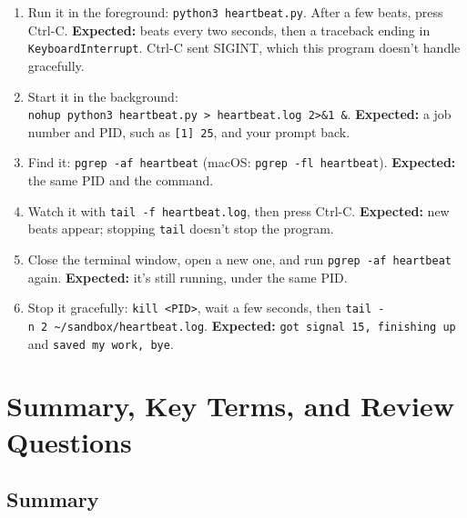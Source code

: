 \begin{enumerate}
\def\labelenumi{\arabic{enumi}.}
\tightlist
\item
  Run it in the foreground: \texttt{python3\ heartbeat.py}. After a few beats, press Ctrl-C. \textbf{Expected:} beats every two seconds, then a traceback ending in \texttt{KeyboardInterrupt}. Ctrl-C sent SIGINT, which this program doesn't handle gracefully.
\item
  Start it in the background: \texttt{nohup\ python3\ heartbeat.}\allowbreak{}\texttt{py\ \textgreater{}\ heartbeat.}\allowbreak{}\texttt{log\ 2\textgreater{}\&}\allowbreak{}\texttt{1\ \&}. \textbf{Expected:} a job number and PID, such as \texttt{{[}1{]}\ 25}, and your prompt back.
\item
  Find it: \texttt{pgrep\ -af\ heartbeat} (macOS: \texttt{pgrep\ -fl\ heartbeat}). \textbf{Expected:} the same PID and the command.
\item
  Watch it with \texttt{tail\ -f\ heartbeat.log}, then press Ctrl-C. \textbf{Expected:} new beats appear; stopping \texttt{tail} doesn't stop the program.
\item
  Close the terminal window, open a new one, and run \texttt{pgrep\ -af\ heartbeat} again. \textbf{Expected:} it's still running, under the same PID.
\item
  Stop it gracefully: \texttt{kill\ \textless{}PID\textgreater{}}, wait a few seconds, then \texttt{tail\ -}\allowbreak{}\texttt{n\ 2\ \textasciitilde{}/}\allowbreak{}\texttt{sandbox/}\allowbreak{}\texttt{heartbeat.}\allowbreak{}\texttt{log}. \textbf{Expected:} \texttt{got\ signal\ 15,}\allowbreak{}\texttt{\ finishing\ up} and \texttt{saved\ my\ work,}\allowbreak{}\texttt{\ bye}.
\end{enumerate}

\section{Summary, Key Terms, and Review Questions}\label{06-programs-that-keep-running:summary-key-terms-and-review-questions}

\subsection*{Summary}\label{06-programs-that-keep-running:summary}

